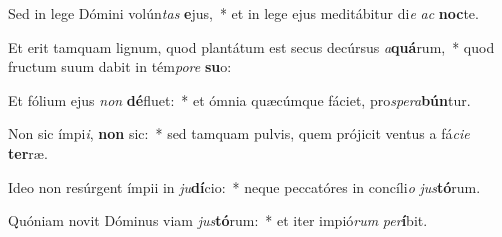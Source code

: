 \item Sed in lege Dómini volún\textit{tas} \textbf{e}jus,~* et in lege ejus meditábitur di\textit{e} \textit{ac} \textbf{noc}te.
\item Et erit tamquam lignum, quod plantátum est secus decúrsus \textit{a}\textbf{quá}rum,~* quod fructum suum dabit in tém\textit{po}\textit{re} \textbf{su}o:
\item Et fólium ejus \textit{non} \textbf{dé}fluet:~* et ómnia quæcúmque fáciet, pro\textit{spe}\textit{ra}\textbf{bún}tur.
\item Non sic ímpi\textit{i}, \textbf{non} sic:~* sed tamquam pulvis, quem prójicit ventus a fá\textit{ci}\textit{e} \textbf{ter}ræ.
\item Ideo non resúrgent ímpii in \textit{ju}\textbf{dí}cio:~* neque peccatóres in concíli\textit{o} \textit{jus}\textbf{tó}rum.
\item Quóniam novit Dóminus viam \textit{jus}\textbf{tó}rum:~* et iter impió\textit{rum} \textit{per}\textbf{í}bit.
